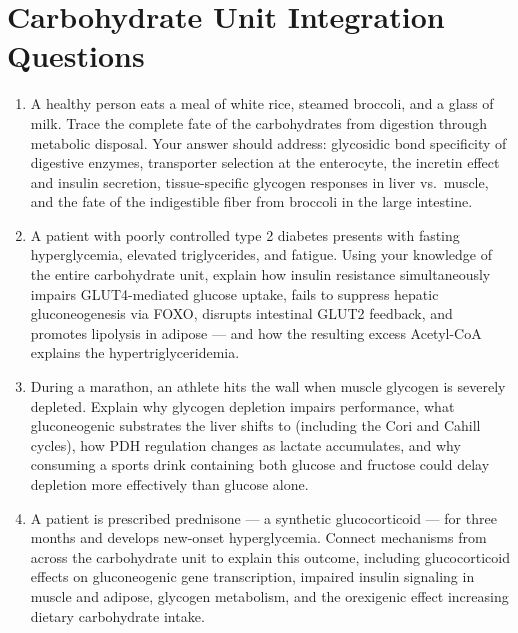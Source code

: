 \documentclass{tufte-handout}
\begin{document}
\section{Carbohydrate Unit Integration Questions}
\begin{enumerate}
\item A healthy person eats a meal of white rice, steamed broccoli, and a glass of milk. Trace the complete fate of the carbohydrates from digestion through metabolic disposal. Your answer should address: glycosidic bond specificity of digestive enzymes, transporter selection at the enterocyte, the incretin effect and insulin secretion, tissue-specific glycogen responses in liver vs.\ muscle, and the fate of the indigestible fiber from broccoli in the large intestine.
\item A patient with poorly controlled type 2 diabetes presents with fasting hyperglycemia, elevated triglycerides, and fatigue. Using your knowledge of the entire carbohydrate unit, explain how insulin resistance simultaneously impairs GLUT4-mediated glucose uptake, fails to suppress hepatic gluconeogenesis via FOXO, disrupts intestinal GLUT2 feedback, and promotes lipolysis in adipose --- and how the resulting excess Acetyl-CoA explains the hypertriglyceridemia.
\item During a marathon, an athlete hits the wall when muscle glycogen is severely depleted. Explain why glycogen depletion impairs performance, what gluconeogenic substrates the liver shifts to (including the Cori and Cahill cycles), how PDH regulation changes as lactate accumulates, and why consuming a sports drink containing both glucose and fructose could delay depletion more effectively than glucose alone.
\item A patient is prescribed prednisone --- a synthetic glucocorticoid --- for three months and develops new-onset hyperglycemia. Connect mechanisms from across the carbohydrate unit to explain this outcome, including glucocorticoid effects on gluconeogenic gene transcription, impaired insulin signaling in muscle and adipose, glycogen metabolism, and the orexigenic effect increasing dietary carbohydrate intake.
\end{enumerate}



\end{document}

